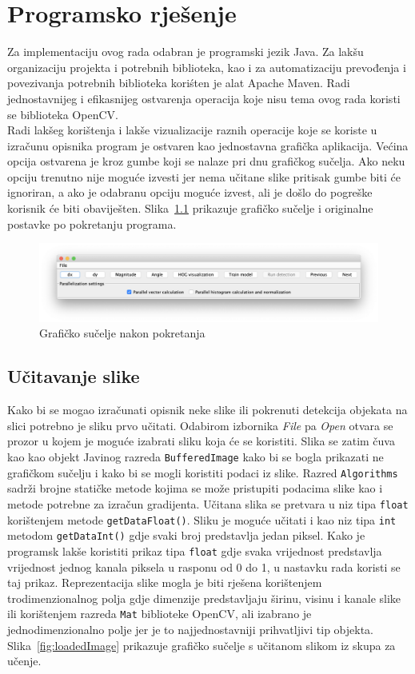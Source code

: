 \documentclass[times, utf8, zavrsni]{fer}
\begin{document}
\chapter{Programsko rješenje}
Za implementaciju ovog rada odabran je programski jezik Java. Za lakšu organizaciju projekta i potrebnih biblioteka, kao i za automatizaciju prevođenja i povezivanja potrebnih biblioteka koriśten je alat Apache Maven. Radi jednostavnijeg i efikasnijeg ostvarenja operacija koje nisu tema ovog rada koristi se biblioteka OpenCV. \\

Radi lakšeg korištenja i lakše vizualizacije raznih operacije koje se koriste u izračunu opisnika program je ostvaren kao jednostavna grafička aplikacija. Većina opcija ostvarena je kroz gumbe koji se nalaze pri dnu grafičkog sučelja. Ako neku opciju trenutno nije moguće izvesti jer nema učitane slike pritisak gumbe biti će ignoriran, a ako je odabranu opciju moguće izvest, ali je došlo do pogreške korisnik će biti obaviješten. Slika~\ref{fig:initialGui} prikazuje grafičko sučelje i originalne postavke po pokretanju programa.

\begin{figure}[htb]
	\centering
	\includegraphics[width=\linewidth]{figures/initialGui.png}
	\caption{Grafičko sučelje nakon pokretanja}
	\label{fig:initialGui}
\end{figure}

\section{Učitavanje slike}
Kako bi se mogao izračunati opisnik neke slike ili pokrenuti detekcija objekata na slici potrebno je sliku prvo učitati. Odabirom izbornika \textit{File} pa \textit{Open} otvara se prozor u kojem je moguće izabrati sliku koja će se koristiti. Slika se zatim čuva kao kao objekt Javinog razreda \verb|BufferedImage| kako bi se bogla prikazati ne grafičkom sučelju i kako bi se mogli koristiti podaci iz slike. Razred \verb|Algorithms| sadrži brojne statičke metode kojima se može pristupiti podacima slike kao i metode potrebne za izračun gradijenta. Učitana slika se pretvara u niz tipa \verb|float| korištenjem metode \verb|getDataFloat()|. Sliku je moguće učitati i kao niz tipa \verb|int| metodom \verb|getDataInt()| gdje svaki broj predstavlja jedan piksel. Kako je programsk lakše koristiti prikaz tipa \verb|float| gdje svaka vrijednost predstavlja vrijednost jednog kanala piksela u rasponu od 0 do 1, u nastavku rada koristi se taj prikaz. Reprezentacija slike mogla je biti rješena korištenjem trodimenzionalnog polja gdje dimenzije predstavljaju širinu, visinu i kanale slike ili korištenjem razreda \verb|Mat| biblioteke OpenCV, ali izabrano je jednodimenzionalno polje jer je to najjednostavniji prihvatljivi tip objekta. Slika~\ref{fig:loadedImage} prikazuje grafičko sučelje s učitanom slikom iz skupa za učenje.
\end{document}
